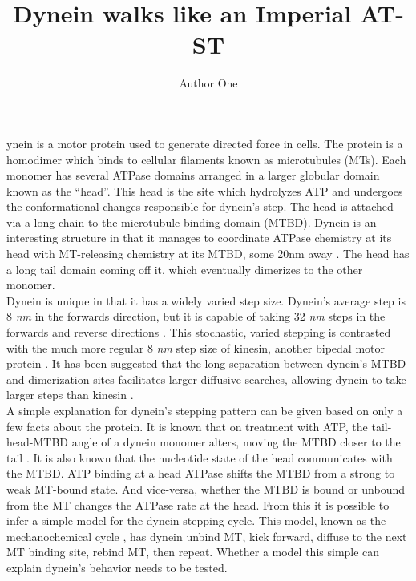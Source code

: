 \documentclass[9pt,twocolumn,twoside]{pnas-new}
\title{Dynein walks like an Imperial AT-ST}
\author[a,c,1]{Author One}
\affil[a]{Oregon State University}
\begin{document}
\verticaladjustment{-2pt}

\maketitle
\thispagestyle{firststyle}

ynein is a motor protein used to generate directed force in cells. The protein is a homodimer which binds to cellular filaments known as microtubules (MTs). Each monomer has several ATPase domains arranged in a larger globular domain known as the ``head''. This head is the site which hydrolyzes ATP and undergoes the conformational changes responsible for dynein's step. The head is attached via a long chain to the microtubule binding domain (MTBD). Dynein is an interesting structure in that it manages to coordinate ATPase chemistry at its head with MT-releasing chemistry at its MTBD, some 20nm away \cite{mt-atp-coupling}. The head has a long tail domain coming off it, which eventually dimerizes to the other monomer.\\

Dynein is unique in that it has a widely varied step size. Dynein's average step is 8 \textit{nm} in the forwards direction, but it is capable of taking 32 \textit{nm} steps in the forwards and reverse directions \cite{weihongpaper} \cite{yildizpaper}. This stochastic, varied stepping is contrasted with the much more regular 8 \textit{nm} step size of kinesin, another bipedal motor protein \cite{kinesin-step-size}. It has been suggested that the long separation between dynein's MTBD and dimerization sites facilitates larger diffusive searches, allowing dynein to take larger steps than kinesin \cite{cargotransport}.\\

A simple explanation for dynein's stepping pattern can be given based on only a few facts about the protein. It is known that on treatment with ATP, the tail-head-MTBD angle of a dynein monomer alters, moving the MTBD closer to the tail \cite{carteradpprimed} \cite{burgess-paper}. It is also known that the nucleotide state of the head communicates with the MTBD. ATP binding at a head ATPase shifts the MTBD from a strong to weak MT-bound state. And vice-versa, whether the MTBD is bound or unbound from the MT changes the ATPase rate at the head. From this it is possible to infer a simple model for the dynein stepping cycle. This model, known as the mechanochemical cycle \cite{cianfroccoreview}, has dynein unbind MT, kick forward, diffuse to the next MT binding site, rebind MT, then repeat. Whether a model this simple can explain dynein's behavior needs to be tested.\\
\end{document}
